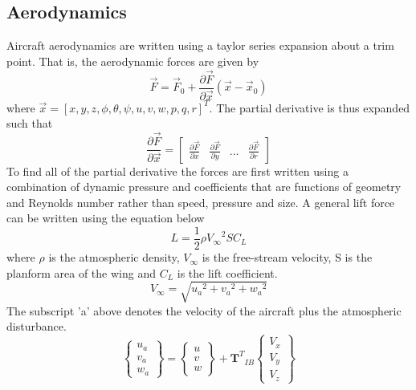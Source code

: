 \documentclass{article}
\begin{document}
\subsection{Aerodynamics}\label{s:aerodynamics}
Aircraft aerodynamics are written using a taylor series expansion
about a trim point\cite{phil}\cite{AndersonD}. That is, the aerodynamic forces are given by
\begin{equation}
\vec{F} = \vec{F}_0 + \frac{\partial \vec{F}}{\partial \vec{x}}(\vec{x}-\vec{x}_0)
\end{equation}
where $\vec{x} = [x,y,z,\phi,\theta,\psi,u,v,w,p,q,r]^T$. The partial
derivative is thus expanded such that
\begin{equation}
\frac{\partial \vec{F}}{\partial \vec{x}} = \begin{bmatrix} \frac{\partial
    \vec{F}}{\partial x} & \frac{\partial \vec{F}}{\partial y} & ... &
  \frac{\partial \vec{F}}{\partial r} \end{bmatrix}
\end{equation}
To find all of the partial derivative the forces are first written
using a combination of dynamic pressure and coefficients that are
functions of geometry and Reynolds number rather than speed, pressure
and size. A general lift force can be written using the equation below
\begin{equation}
L = \frac{1}2\rho {V_{\infty}}^2 S C_L
\end{equation}
where $\rho$ is the atmospheric density, $V_{\infty}$ is the
free-stream velocity, S is the planform area of the wing and $C_L$ is
the lift coefficient. 
\begin{equation}\label{e:vtotal}
  V_{\infty} = \sqrt{{u_a}^2 + {v_a}^2 + {w_a}^2}
\end{equation}
The subscript 'a' above denotes the velocity of the aircraft plus the
atmospheric disturbance. 
\begin{equation}\label{e:atm}
\begin{Bmatrix} u_a \\ v_a \\ w_a \end{Bmatrix} =
\begin{Bmatrix} u \\ v \\ w \end{Bmatrix} +
{\textbf{T}^T}_{IB} \begin{Bmatrix}
 V_x \\ V_y \\ V_z \end{Bmatrix}
\end{equation}
\end{document}
